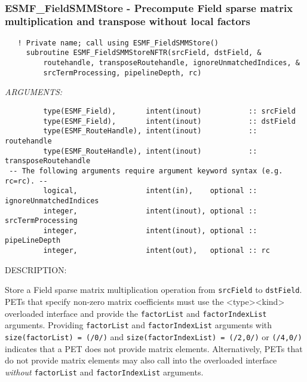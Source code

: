  
\mbox{}\hrulefill\ 
 
\subsubsection [ESMF\_FieldSMMStore] {ESMF\_FieldSMMStore - Precompute Field sparse matrix multiplication and transpose without local factors}


   
\begin{verbatim}   ! Private name; call using ESMF_FieldSMMStore() 
     subroutine ESMF_FieldSMMStoreNFTR(srcField, dstField, &
         routehandle, transposeRoutehandle, ignoreUnmatchedIndices, &
         srcTermProcessing, pipelineDepth, rc)\end{verbatim}{\em ARGUMENTS:}
\begin{verbatim}         type(ESMF_Field),       intent(inout)           :: srcField  
         type(ESMF_Field),       intent(inout)           :: dstField  
         type(ESMF_RouteHandle), intent(inout)           :: routehandle
         type(ESMF_RouteHandle), intent(inout)           :: transposeRoutehandle
 -- The following arguments require argument keyword syntax (e.g. rc=rc). --
         logical,                intent(in),    optional :: ignoreUnmatchedIndices
         integer,                intent(inout), optional :: srcTermProcessing
         integer,                intent(inout), optional :: pipeLineDepth
         integer,                intent(out),   optional :: rc \end{verbatim}
{\sf DESCRIPTION:\\ }

 
  
   \begin{sloppypar}
   Store a Field sparse matrix multiplication operation from {\tt srcField}
   to {\tt dstField}. PETs that specify non-zero matrix coefficients must use
   the <type><kind> overloaded interface and provide the {\tt factorList} and
   {\tt factorIndexList} arguments. Providing {\tt factorList} and
   {\tt factorIndexList} arguments with {\tt size(factorList) = (/0/)} and
   {\tt size(factorIndexList) = (/2,0/)} or {\tt (/4,0/)} indicates that a 
   PET does not provide matrix elements. Alternatively, PETs that do not 
   provide matrix elements may also call into the overloaded interface
   {\em without} {\tt factorList} and {\tt factorIndexList} arguments.
   \end{sloppypar}
   

